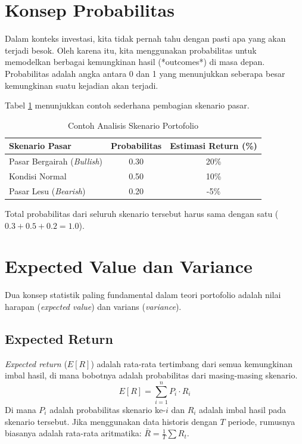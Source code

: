 \documentclass[12pt,a4paper]{book}
\begin{document}
\section{Konsep Probabilitas}
Dalam konteks investasi, kita tidak pernah tahu dengan pasti apa yang akan terjadi besok. Oleh karena itu, kita menggunakan probabilitas untuk memodelkan berbagai kemungkinan hasil (*outcomes*) di masa depan. Probabilitas adalah angka antara 0 dan 1 yang menunjukkan seberapa besar kemungkinan suatu kejadian akan terjadi. 

Tabel \ref{tab:skenario} menunjukkan contoh sederhana pembagian skenario pasar.
\begin{table}[h]
    \centering
    \caption{Contoh Analisis Skenario Portofolio}
    \label{tab:skenario}
    \begin{tabular}{|l|c|c|}
        \hline
        \textbf{Skenario Pasar} & \textbf{Probabilitas} & \textbf{Estimasi Return (\%)} \\ \hline
        Pasar Bergairah (\textit{Bullish}) & 0.30 & 20\% \\ \hline
        Kondisi Normal & 0.50 & 10\% \\ \hline
        Pasar Lesu (\textit{Bearish}) & 0.20 & -5\% \\ \hline
    \end{tabular}
\end{table}

Total probabilitas dari seluruh skenario tersebut harus sama dengan satu ($0.3 + 0.5 + 0.2 = 1.0$).

\section{Expected Value dan Variance}
Dua konsep statistik paling fundamental dalam teori portofolio adalah nilai harapan (\textit{expected value}) dan varians (\textit{variance}).

\subsection{Expected Return}
\textit{Expected return} ($E[R]$) adalah rata-rata tertimbang dari semua kemungkinan imbal hasil, di mana bobotnya adalah probabilitas dari masing-masing skenario.
\begin{equation}
    E[R] = \sum_{i=1}^{n} P_i \cdot R_i
\end{equation}
Di mana $P_i$ adalah probabilitas skenario ke-$i$ dan $R_i$ adalah imbal hasil pada skenario tersebut. Jika menggunakan data historis dengan $T$ periode, rumusnya biasanya adalah rata-rata aritmatika: $\bar{R} = \frac{1}{T} \sum R_t$.
\end{document}
